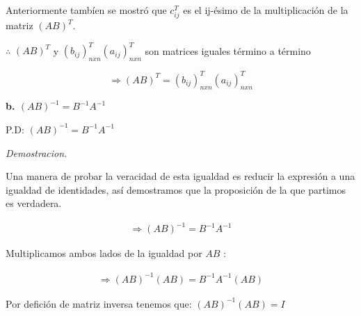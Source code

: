 \vspace*{0.5cm}

Anteriormente tambíen se mostró que $ c_{ij}^{T}  $ es el ij-ésimo de la multiplicación de
la matriz $(AB)^{T}$.

\vspace*{0.5cm}

$ \therefore $ $(AB)^{T}$ y  $ \left(b_{ij}\right)_{nxn}^{T} \left(a_{ij}\right)_{nxn}^{T} $
son matrices iguales término a término

\begin{equation*}
    \Rightarrow  (AB)^{T} = \left(b_{ij}\right)_{nxn}^{T} \left(a_{ij}\right)_{nxn}^{T}
\end{equation*}

\vspace*{1cm}


\noindent
\textbf{b. $ (AB)^{-1} = B^{-1} A^{-1}  $}

\vspace*{0.5cm}

\noindent
P.D: $ \left(AB\right)^{-1} = B^{-1} A^{-1} $

\vspace*{0.45cm}

\emph{Demostracion.}

\vspace{0.45cm}

Una manera de probar la veracidad de esta igualdad es reducir la expresión a una igualdad
de identidades, así demostramos que la proposición de la que partimos es verdadera.

\vspace{0.2cm}

\begin{gather*}
    \Rightarrow \left(AB\right)^{-1} = B^{-1} A^{-1}
\end{gather*}

\vspace*{0.2cm}

Multiplicamos ambos lados de la igualdad por $AB$ :

\begin{gather*}
    \Rightarrow \left(AB\right)^{-1} \left(AB\right) = B^{-1} A^{-1} \left(AB\right)
\end{gather*}

\vspace*{0.2cm}

Por defición de matriz inversa tenemos que: $ \left(AB\right)^{-1} \left(AB\right) = I $

